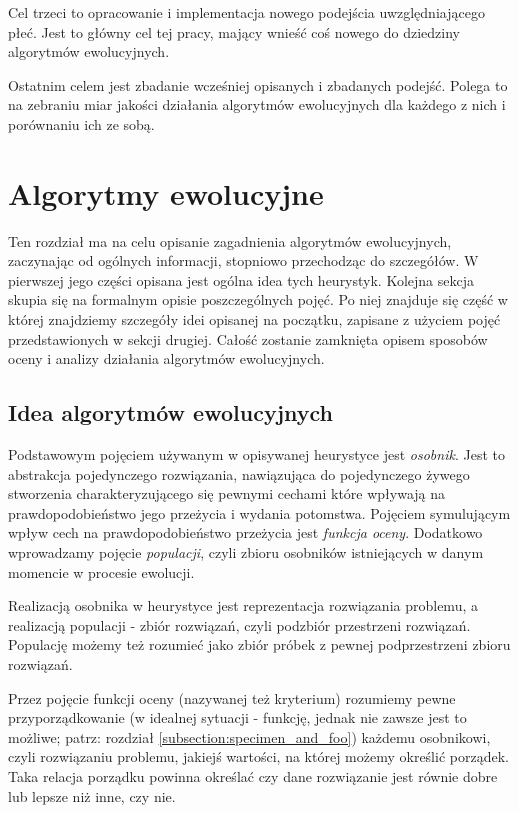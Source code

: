 \documentclass[twoside]{iisthesis}
\begin{document}
Cel trzeci to opracowanie i implementacja nowego podejścia uwzględniającego płeć.
Jest to główny cel tej pracy, mający wnieść coś nowego do dziedziny algorytmów ewolucyjnych.

Ostatnim celem jest zbadanie wcześniej opisanych i zbadanych podejść.
Polega to na zebraniu miar jakości działania algorytmów ewolucyjnych dla każdego z nich i porównaniu ich ze sobą.

\chapter{Algorytmy ewolucyjne} \label{chapter:eaDesc}

Ten rozdział ma na celu opisanie zagadnienia algorytmów ewolucyjnych, zaczynając od ogólnych informacji, stopniowo przechodząc do szczegółów.
W pierwszej jego części opisana jest ogólna idea tych heurystyk. 
Kolejna sekcja skupia się na formalnym opisie poszczególnych pojęć.
Po niej znajduje się część w której znajdziemy szczegóły idei opisanej na początku, zapisane z użyciem pojęć przedstawionych w sekcji drugiej.
Całość zostanie zamknięta opisem sposobów oceny i analizy działania algorytmów ewolucyjnych.

\section{Idea algorytmów ewolucyjnych} \label{section:general_idea}

Podstawowym pojęciem używanym w opisywanej heurystyce jest \emph{osobnik}. 
Jest to abstrakcja pojedynczego rozwiązania, nawiązująca do pojedynczego żywego stworzenia charakteryzującego się pewnymi cechami które wpływają na prawdopodobieństwo jego przeżycia i wydania potomstwa. 
Pojęciem symulującym wpływ cech na prawdopodobieństwo przeżycia jest \emph{funkcja oceny}. 
Dodatkowo wprowadzamy pojęcie \emph{populacji}, czyli zbioru osobników istniejących w danym momencie w procesie ewolucji.

Realizacją osobnika w heurystyce jest reprezentacja rozwiązania problemu, a realizacją populacji - zbiór rozwiązań, czyli podzbiór przestrzeni rozwiązań.
Populację możemy też rozumieć jako zbiór próbek z pewnej podprzestrzeni zbioru rozwiązań.

Przez pojęcie funkcji oceny (nazywanej też kryterium) rozumiemy pewne przyporządkowanie (w idealnej sytuacji - funkcję, jednak nie zawsze jest to możliwe; patrz: rozdział \ref{subsection:specimen_and_foo}) każdemu osobnikowi, czyli rozwiązaniu problemu, jakiejś wartości, na której możemy określić porządek.
Taka relacja porządku powinna określać czy dane rozwiązanie jest równie dobre lub lepsze niż inne, czy nie.
\end{document}
